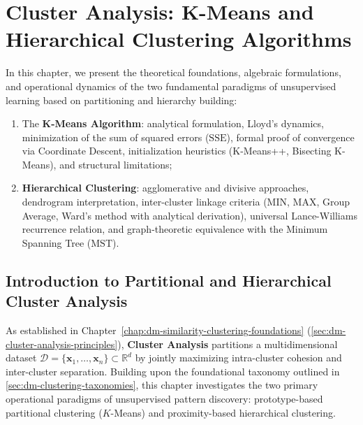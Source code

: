 \chapter{Cluster Analysis: K-Means and Hierarchical Clustering Algorithms}
\label{chap:dm-kmeans-hierarchical}

In this chapter, we present the theoretical foundations, algebraic formulations, and operational dynamics of the two fundamental paradigms of unsupervised learning based on partitioning and hierarchy building:
\begin{enumerate}[noitemsep]
    \item The \textbf{K-Means Algorithm}: analytical formulation, Lloyd's dynamics, minimization of the sum of squared errors ($\mathrm{SSE}$), formal proof of convergence via Coordinate Descent, initialization heuristics (K-Means++, Bisecting K-Means), and structural limitations;
    \item \textbf{Hierarchical Clustering}: agglomerative and divisive approaches, dendrogram interpretation, inter-cluster linkage criteria (MIN, MAX, Group Average, Ward's method with analytical derivation), universal Lance-Williams recurrence relation, and graph-theoretic equivalence with the Minimum Spanning Tree ($\mathrm{MST}$).
\end{enumerate}

\section{Introduction to Partitional and Hierarchical Cluster Analysis}
\label{sec:dm-clustering-intro-taxonomy}

As established in Chapter~\ref{chap:dm-similarity-clustering-foundations} (\autoref{sec:dm-cluster-analysis-principles}), \textbf{Cluster Analysis} partitions a multidimensional dataset $\mathcal{D} = \{\mathbf{x}_1, \dots, \mathbf{x}_n\} \subset \mathbb{R}^d$ by jointly maximizing intra-cluster cohesion and inter-cluster separation. Building upon the foundational taxonomy outlined in \autoref{sec:dm-clustering-taxonomies}, this chapter investigates the two primary operational paradigms of unsupervised pattern discovery: prototype-based partitional clustering ($K$-Means) and proximity-based hierarchical clustering.


